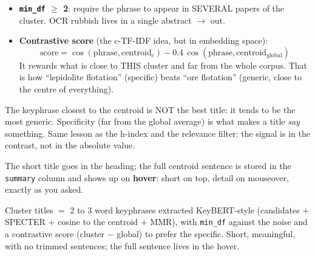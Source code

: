 \documentclass[11pt,a4paper]{article}
\begin{document}
\begin{itemize}
  \item \textbf{\texttt{min\_df} $\geq$ 2}: require the phrase to appear in SEVERAL papers of
        the cluster. OCR rubbish lives in a single abstract $\to$ out.
  \item \textbf{Contrastive score} (the c-TF-IDF idea, but in embedding space):
        \[
        \mathrm{score} = \cos(\mathrm{phrase}, \mathrm{centroid}_c)
                       - 0.4 \, \cos(\mathrm{phrase}, \mathrm{centroid}_{\mathrm{global}})
        \]
        It rewards what is close to THIS cluster and far from the whole corpus. That is how
        ``lepidolite flotation'' (specific) beats ``ore flotation'' (generic, close to the
        centre of everything).
\end{itemize}

\begin{ojo}
The keyphrase closest to the centroid is NOT the best title: it tends to be the most generic.
Specificity (far from the global average) is what makes a title \emph{say} something. Same
lesson as the h-index and the relevance filter: the signal is in the contrast, not in the
absolute value.
\end{ojo}

\begin{practica}
The short title goes in the heading; the full centroid sentence is stored in the
\texttt{summary} column and shows up on \textbf{hover}: short on top, detail on mouseover,
exactly as you asked.
\end{practica}

\begin{resumen}
Cluster titles $=$ 2 to 3 word keyphrases extracted KeyBERT-style (candidates $+$ SPECTER $+$
cosine to the centroid $+$ MMR), with \texttt{min\_df} against the noise and a contrastive score
(cluster $-$ global) to prefer the specific. Short, meaningful, with no trimmed sentences; the
full sentence lives in the hover.
\end{resumen}
\end{document}
